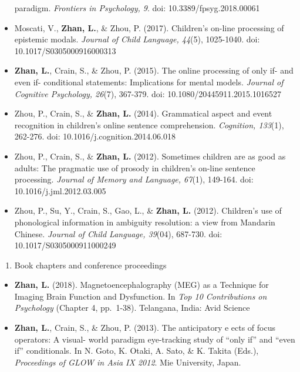 \documentclass[12pt,]{article}
\providecommand{\tightlist}{%
  \setlength{\itemsep}{0pt}\setlength{\parskip}{0pt}}
\begin{document}
\begin{itemize}
  paradigm. \emph{Frontiers in Psychology, 9}. doi:
  10.3389/fpsyg.2018.00061
  \href{https://www.frontiersin.org/articles/10.3389/fpsyg.2018.00061/full}{
  \faFilePdf[regular] }
\item
  Moscati, V., \textbf{Zhan, L.}, \& Zhou, P. (2017). Children's on-line
  processing of epistemic modals. \emph{Journal of Child Language,
  44}(5), 1025-1040. doi: 10.1017/S0305000916000313
  \href{https://publications.likan.info/Periodicals/JChildLang2016.pdf}{
  \faFilePdf[regular] }
\item
  \textbf{Zhan, L.}, Crain, S., \& Zhou, P. (2015). The online
  processing of only if- and even if- conditional statements:
  Implications for mental models. \emph{Journal of Cognitive Psychology,
  26}(7), 367-379. doi: 10.1080/20445911.2015.1016527
  \href{https://publications.likan.info/Periodicals/JCognPsychol2015.pdf}{
  \faFilePdf[regular] }
\item
  Zhou, P., Crain, S., \& \textbf{Zhan, L.} (2014). Grammatical aspect
  and event recognition in children's online sentence comprehension.
  \emph{Cognition, 133}(1), 262-276. doi:
  10.1016/j.cognition.2014.06.018
  \href{http://publications.likan.info/Periodicals/Cognition2014.pdf}{
  \faFilePdf[regular] }
\item
  Zhou, P., Crain, S., \& \textbf{Zhan, L.} (2012). Sometimes children
  are as good as adults: The pragmatic use of prosody in children's
  on-line sentence processing. \emph{Journal of Memory and Language,
  67}(1), 149-164. doi: 10.1016/j.jml.2012.03.005
  \href{https://publications.likan.info/Periodicals/JMemLang2012.pdf}{
  \faFilePdf[regular] }
\item
  Zhou, P., Su, Y., Crain, S., Gao, L., \& \textbf{Zhan, L.} (2012).
  Children's use of phonological information in ambiguity resolution: a
  view from Mandarin Chinese. \emph{Journal of Child Language, 39}(04),
  687-730. doi: 10.1017/S0305000911000249
  \href{https://publications.likan.info/Periodicals/JChildLang2012.pdf}{
  \faFilePdf[regular] }
\end{itemize}

\begin{enumerate}
\def\labelenumi{\arabic{enumi}.}
\setcounter{enumi}{2}
\tightlist
\item
  Book chapters and conference proceedings
\end{enumerate}

\begin{itemize}
\item
  \textbf{Zhan, L.} (2018). Magnetoencephalography (MEG) as a Technique
  for Imaging Brain Function and Dysfunction. In \emph{Top 10
  Contributions on Psychology} (Chapter 4, pp.~1-38). Telangana, India:
  Avid Science
\item
  \textbf{Zhan, L.}, Crain, S., \& Zhou, P. (2013). The anticipatory e
  ects of focus operators: A visual- world paradigm eye-tracking study
  of ``only if'' and ``even if'' conditionals. In N. Goto, K. Otaki, A.
  Sato, \& K. Takita (Eds.), \emph{Proceedings of GLOW in Asia IX 2012}.
  Mie University, Japan.
\end{itemize}
\end{document}
